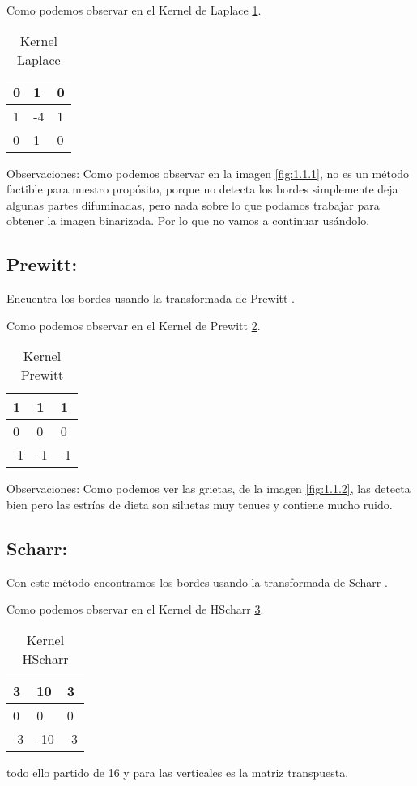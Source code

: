 Como podemos observar en el Kernel de Laplace \ref{F_k1}.
\begin{table}[]
	\centering
	\caption{Kernel Laplace}
	\label{F_k1}
	\begin{tabular}{|l|l|l|}
		\hline
		0 & 1  & 0 \\ \hline
		1 & -4 & 1 \\ \hline
		0 & 1  & 0 \\ \hline
	\end{tabular}
\end{table}

Observaciones:
Como podemos observar en la imagen \ref{fig:1.1.1}, no es un método factible para nuestro propósito, porque no detecta los bordes simplemente deja algunas partes difuminadas, pero nada sobre lo que podamos trabajar para obtener la imagen binarizada. Por lo que no vamos a continuar usándolo.

\subsection{Prewitt:}

Encuentra los bordes usando la transformada de Prewitt \cite{wiki:Prewitt}.

Como podemos observar en el Kernel de Prewitt \ref{F_k2}.
\begin{table}[]
	\centering
	\caption{Kernel Prewitt}
	\label{F_k2}
	\begin{tabular}{|l|l|l|}
		\hline
		1  & 1   & 1 \\ \hline
		0  & 0   & 0 \\ \hline
		-1 & -1  & -1 \\ \hline
	\end{tabular}
\end{table}



Observaciones:
Como podemos ver las grietas, de la imagen \ref{fig:1.1.2}, las detecta bien pero las estrías de dieta son siluetas muy tenues y contiene mucho ruido.


\subsection{Scharr:}
Con este método encontramos los bordes usando la transformada de Scharr \cite{wiki:Scharr}.

Como podemos observar en el Kernel de HScharr \ref{F_k3}.
\begin{table}[]
	\centering
	\caption{Kernel HScharr}
	\label{F_k3}
	\begin{tabular}{|l|l|l|}
		\hline
		3  & 10  & 3 \\ \hline
		0  & 0   & 0 \\ \hline
		-3 & -10 & -3 \\ \hline
	\end{tabular}
\end{table}
todo ello partido de 16 y para las verticales es la matriz transpuesta. 




